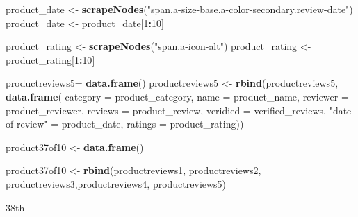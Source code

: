 \documentclass[
]{article}
\newenvironment{Shaded}{\begin{snugshade}}{\end{snugshade}}
\newcommand{\AttributeTok}[1]{\textcolor[rgb]{0.13,0.29,0.53}{#1}}
\newcommand{\DecValTok}[1]{\textcolor[rgb]{0.00,0.00,0.81}{#1}}
\newcommand{\FunctionTok}[1]{\textcolor[rgb]{0.13,0.29,0.53}{\textbf{#1}}}
\newcommand{\NormalTok}[1]{#1}
\newcommand{\OtherTok}[1]{\textcolor[rgb]{0.56,0.35,0.01}{#1}}
\newcommand{\SpecialCharTok}[1]{\textcolor[rgb]{0.81,0.36,0.00}{\textbf{#1}}}
\newcommand{\StringTok}[1]{\textcolor[rgb]{0.31,0.60,0.02}{#1}}
\begin{document}
\begin{Shaded}
\begin{Highlighting}[]
\NormalTok{  product\_date }\OtherTok{\textless{}{-}} \FunctionTok{scrapeNodes}\NormalTok{(}\StringTok{"span.a{-}size{-}base.a{-}color{-}secondary.review{-}date"}\NormalTok{)}
\NormalTok{  product\_date }\OtherTok{\textless{}{-}}\NormalTok{ product\_date[}\DecValTok{1}\SpecialCharTok{:}\DecValTok{10}\NormalTok{]}
  
\NormalTok{  product\_rating }\OtherTok{\textless{}{-}} \FunctionTok{scrapeNodes}\NormalTok{(}\StringTok{"span.a{-}icon{-}alt"}\NormalTok{)}
\NormalTok{  product\_rating }\OtherTok{\textless{}{-}}\NormalTok{ product\_rating[}\DecValTok{1}\SpecialCharTok{:}\DecValTok{10}\NormalTok{]}
  
\NormalTok{  productreviews5}\OtherTok{=} \FunctionTok{data.frame}\NormalTok{()}
\NormalTok{  productreviews5 }\OtherTok{\textless{}{-}} \FunctionTok{rbind}\NormalTok{(productreviews5, }\FunctionTok{data.frame}\NormalTok{(}
                      \AttributeTok{category =}\NormalTok{ product\_category,}
                      \AttributeTok{name =}\NormalTok{ product\_name,}
                      \AttributeTok{reviewer =}\NormalTok{ product\_reviewer,}
                      \AttributeTok{reviews =}\NormalTok{ product\_review,}
                      \AttributeTok{veridied =}\NormalTok{ verified\_reviews,}
                      \StringTok{"date of review"} \OtherTok{=}\NormalTok{ product\_date,}
                      \AttributeTok{ratings =}\NormalTok{ product\_rating))}
  
\NormalTok{  product37of10 }\OtherTok{\textless{}{-}} \FunctionTok{data.frame}\NormalTok{()}
  
\NormalTok{  product37of10 }\OtherTok{\textless{}{-}} \FunctionTok{rbind}\NormalTok{(productreviews1, productreviews2, productreviews3,productreviews4, productreviews5)}
\end{Highlighting}
\end{Shaded}

38th
\end{document}
